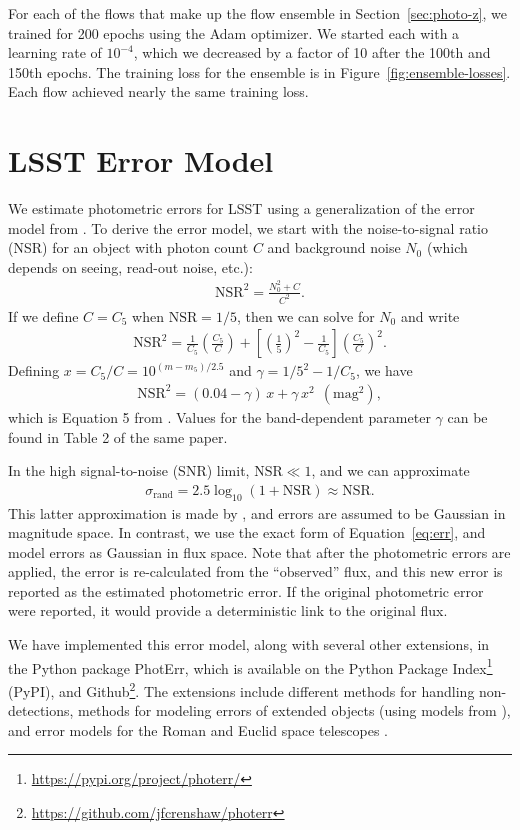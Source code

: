 \documentclass[twocolumn,twocolappendix]{aastex631}
\begin{document}
For each of the flows that make up the flow ensemble in Section~\ref{sec:photo-z}, we trained for 200 epochs using the Adam optimizer.
We started each with a learning rate of $10^{-4}$, which we decreased by a factor of 10 after the 100th and 150th epochs.
The training loss for the ensemble is in Figure~\ref{fig:ensemble-losses}.
Each flow achieved nearly the same training loss.


\section{LSST Error Model}
\label{app:error-model}

We estimate photometric errors for LSST using a generalization of the error model from \citet{ivezic2019}.
To derive the error model, we start with the noise-to-signal ratio (NSR) for an object with photon count $C$ and background noise $N_0$ (which depends on seeing, read-out noise, etc.):
\begin{align}
    \text{NSR}^2 = \frac{N_0^2 + C}{C^2}.
\end{align}
If we define $C=C_5$ when $\text{NSR}= 1/5$, then we can solve for $N_0$ and write
\begin{align}
    \text{NSR}^2 = \frac{1}{C_5} \left( \frac{C_5}{C} \right) + \left[ \left( \frac{1}{5} \right)^2 - \frac{1}{C_5} \right] \left( \frac{C_5}{C} \right)^2.
\end{align}
Defining $x = C_5/C = 10^{(m-m_5)/2.5}$ and $\gamma = 1/5^2 - 1/C_5$, we have
\begin{align}
    \text{NSR}^2 = (0.04 - \gamma) \, x + \gamma \, x^2 ~~ (\text{mag}^2),
\end{align}
which is Equation 5 from \citet{ivezic2019}.
Values for the band-dependent parameter $\gamma$ can be found in Table 2 of the same paper.

In the high signal-to-noise (SNR) limit, $\text{NSR} \ll 1$, and we can approximate
\begin{align}
    \sigma_\text{rand} = 2.5 \log_{10}(1 + \text{NSR}) \approx \text{NSR}.
    \label{eq:err}
\end{align}
This latter approximation is made by \citet{ivezic2019}, and errors are assumed to be Gaussian in magnitude space.
In contrast, we use the exact form of Equation~\ref{eq:err}, and model errors as Gaussian in flux space.
Note that after the photometric errors are applied, the error is re-calculated from the ``observed'' flux, and this new error is reported as the estimated photometric error.
If the original photometric error were reported, it would provide a deterministic link to the original flux.

We have implemented this error model, along with several other extensions, in the Python package PhotErr, which is available on the Python Package Index\footnote{\url{https://pypi.org/project/photerr/}} (PyPI), and Github\footnote{\url{https://github.com/jfcrenshaw/photerr}}.
The extensions include different methods for handling non-detections, methods for modeling errors of extended objects (using models from \citealt{vandenbusch2020,kuijken2019}), and error models for the Roman and Euclid space telescopes \citep{roman,euclid,graham2020}.




\end{document}
